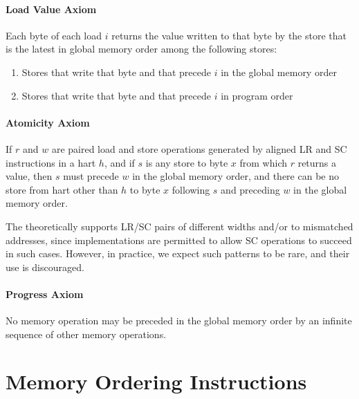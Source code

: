 \newcommand{\loadvalueaxiom}{
  Each byte of each load $i$ returns the value written to that byte by the store that is the latest in global memory order among the following stores:
  \begin{enumerate}
    \item Stores that write that byte and that precede $i$ in the global memory order
    \item Stores that write that byte and that precede $i$ in program order
  \end{enumerate}
}

\newcommand{\atomicityaxiom}{If $r$ and $w$ are paired load and store operations generated by aligned LR and SC instructions in a hart $h$, and if $s$ is any store to byte $x$ from which $r$ returns a value, then $s$ must precede $w$ in the global memory order, and there can be no store from hart other than $h$ to byte $x$ following $s$ and preceding $w$ in the global memory order.}

\newcommand{\progressaxiom}{No memory operation may be preceded in the global memory order by an infinite sequence of other memory operations.}

\paragraph{Load Value Axiom}
\label{rvwmo:ax:load}
\loadvalueaxiom

\paragraph{Atomicity Axiom}
\label{rvwmo:ax:atom}
\atomicityaxiom

\begin{commentary}
  The  theoretically supports LR/SC pairs of different widths and/or to mismatched addresses, since implementations are permitted to allow SC operations to succeed in such cases.  However, in practice, we expect such patterns to be rare, and their use is discouraged.
\end{commentary}

\paragraph{Progress Axiom}
\label{rvwmo:ax:prog}
\progressaxiom

\section{Memory Ordering Instructions}
\label{sec:fence}

